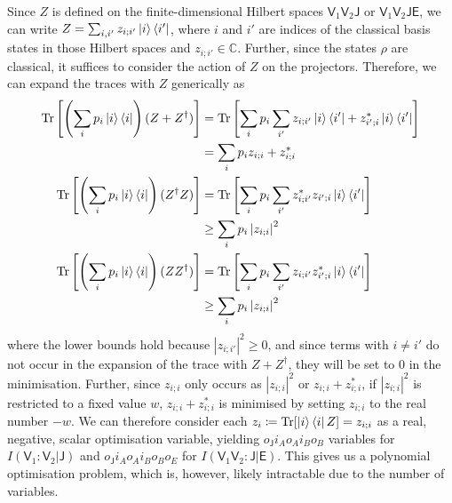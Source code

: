\documentclass[10pt, a4paper]{article}
\numberwithin{equation}{section} %
\theoremstyle{definition}
\theoremstyle{plain}
\newcommand{\abs}[1]{\left\lvert#1\right\rvert}
\newcommand{\?}{\mathrel{?}} %
\newcommand{\C}{\mathbb{C}} %
\newcommand{\Tr}{\mathrm{Tr}} %
\newcommand{\crv}[1]{\mathsf{#1}}
\begin{document}
\begin{appendices}
    Since \(Z\) is defined on the finite-dimensional Hilbert spaces \(\crv{V}_1\crv{V}_2\crv{J}\) or \(\crv{V}_1\crv{V}_2\crv{JE}\), we can write \(Z = \sum_{i,i'} z_{i;i'} \ket{i}\bra{i'}\), where \(i\) and \(i'\) are indices of the classical basis states in those Hilbert spaces and \(z_{i;i'} \in \C\). Further, since the states \(\rho\) are classical, it suffices to consider the action of \(Z\) on the projectors. Therefore, we can expand the traces with \(Z\) generically as
  \begin{align}
    \Tr\left[\left(\sum_i p_i \ket{i}\bra{i}\right) (Z + Z^{\dagger})\right] &= 
    \Tr\left[ \sum_i p_i \sum_{i'} z_{i;i'} \ket{i}\bra{i'} + {z_{i';i}^*} \ket{i}\bra{i'} \right] \\
                                                            &= 
    \sum_i p_i z_{i;i} + {z_{i;i}^*} \\
    \Tr\left[\left(\sum_i p_i \ket{i}\bra{i}\right) (Z^{\dagger}Z)\right] &=
    \Tr\left[ \sum_i p_i \sum_{i'} {z_{i;i'}^*} z_{i';i} \ket{i}\bra{i'} \right] \\
                                                            &\geq 
    \sum_i p_i \abs{z_{i;i}}^2 \\
    \Tr\left[\left(\sum_i p_i \ket{i}\bra{i}\right) (ZZ^{\dagger})\right] &= 
    \Tr\left[ \sum_i p_i \sum_{i'} z_{i;i'} {z_{i';i}^*} \ket{i}\bra{i'} \right] \\
                                                            &\geq 
    \sum_i p_i \abs{z_{i;i}}^2
  \end{align}
  where the lower bounds hold because \(\abs{z_{i;i'}}^2 \geq 0\), and since terms with \(i \neq i'\) do not occur in the expansion of the trace with \(Z + Z^{\dagger}\), they will be set to 0 in the minimisation. Further, since \(z_{i;i}\) only occurs as \(\abs{z_{i;i}}^2\) or \(z_{i;i} + {z_{i;i}^*}\), if \(\abs{z_{i;i}}^2\) is restricted to a fixed value \(w\), \(z_{i;i} + {z_{i;i}^*}\) is minimised by setting \(z_{i;i}\) to the real number \(-w\). We can therefore consider each \(z_i \coloneqq \Tr[\ket{i}\bra{i} Z] = z_{i;i}\) as a real, negative, scalar optimisation variable, yielding \(o_{\crv{J}} i_A o_A i_B o_B\) variables for \(I(\crv{V}_1 : \crv{V}_2|\crv{J})\) and \(o_{\crv{J}} i_A o_A i_B o_B o_E\) for \(I(\crv{V}_1\crv{V}_2 : \crv{J}|\crv{E})\). This gives us a polynomial optimisation problem, which is, however, likely intractable due to the number of variables.


\end{appendices}
\end{document}
